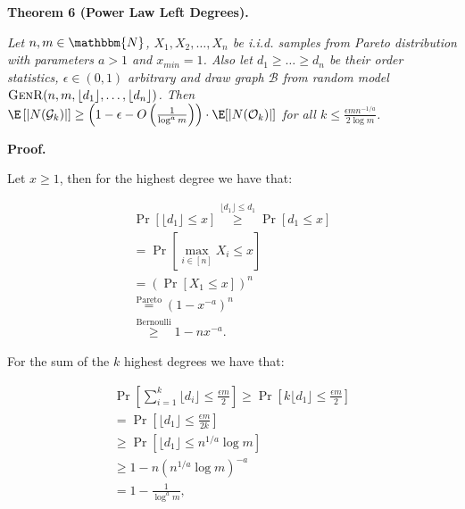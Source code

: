 \documentclass[10pt,a4paper]{article}
\begin{document}


\par\medskip\noindent\textbf{\textbf{Theorem 6}\textbf{ }(Power Law Left Degrees)\textbf{.}}\par



\emph{Let $n,m\in\mathbbm{N}$, $X_{1},X_{2},\dots,X_{n}$ be i.i.d. samples from Pareto distribution with parameters $a>1$ and $x_{min}=1$.
Also let $d_{1}\geq\dots\geq d_{n}$ be their order statistics, $\epsilon\in(0,1)$ arbitrary and draw graph $\mathcal{B}$ from random model $\textsc{GenR}(n,m,\lfloor d_{1}\rfloor,\dots,\lfloor d_{n}\rfloor)$.
Then $\E\left[|N(\mathcal{G}_{k})|\right]\geq\left(1-\epsilon-O\left(\frac{1}{\log^{a}{m}}\right)\right)\cdot\E[|N(\mathcal{O}_{k})|]$
for all $k\leq\frac{\epsilon mn^{-1/a}}{2\log{m}}$.}\par






\par\medskip\noindent\textbf{Proof.}\par



Let $x\geq 1$, then for the highest degree we have that:\par


\[\begin{gathered}
\displaystyle\Pr\left[\lfloor d_{1}\rfloor\leq x\right] \displaystyle\overset{\lfloor d_{1}\rfloor\leq d_{1}}{\geq}\Pr\left[d_{1}\leq x\right] \\
\displaystyle=\Pr\left[\max_{i\in[n]}X_{i}\leq x\right] \\
\displaystyle=\left(\Pr\left[X_{1}\leq x\right]\right)^{n} \\
\displaystyle\overset{\text{Pareto}}{=}\left(1-x^{-a}\right)^{n} \\
\displaystyle\overset{\text{Bernoulli}}{\geq}1-nx^{-a}.
\end{gathered}\]


For the sum of the $k$ highest degrees we have that:\par


\[\begin{gathered}
\displaystyle\Pr\left[\sum_{i=1}^{k}\lfloor d_{i}\rfloor\leq\frac{\epsilon m}{2}\right] \displaystyle\geq\Pr\left[k\lfloor d_{1}\rfloor\leq\frac{\epsilon m}{2}\right] \\
\displaystyle=\Pr\left[\lfloor d_{1}\rfloor\leq\frac{\epsilon m}{2k}\right] \\
\displaystyle\geq\Pr\left[\lfloor d_{1}\rfloor\leq n^{1/a}\log{m}\right] \\
\displaystyle\geq 1-n\left(n^{1/a}\log{m}\right)^{-a} \\
\displaystyle=1-\frac{1}{\log^{a}{m}},
\end{gathered}\]
\end{document}
